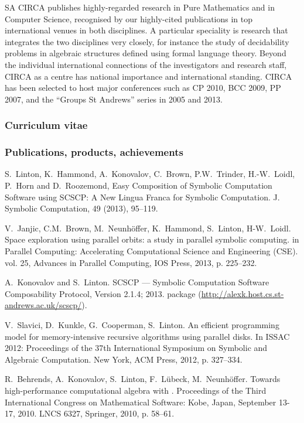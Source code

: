 \begin{sitedescription}{SA}
CIRCA publishes highly-regarded research in Pure Mathematics and in
Computer Science, recognised by our highly-cited publications in top
international venues in both disciplines. A particular speciality is
research that integrates the two disciplines very closely, for
instance the study of decidability problems in algebraic structures
defined using formal language theory. Beyond the individual international connections of the 
investigators and research staff, CIRCA as a centre has national 
importance and international standing. CIRCA has been selected to host 
major conferences such as CP 2010, BCC 2009, PP 2007, and the 
``Groups St Andrews'' series in 2005 and 2013.


\subsubsection*{Curriculum vitae}





%


\subsubsection*{Publications, products, achievements}

\begin{compactenum}
\item 
S.~Linton, K.~Hammond, A.~Konovalov, C.~Brown, P.W.~Trinder, H.-W.~Loidl, 
P.~Horn and D.~Roozemond, Easy Composition of Symbolic Computation Software using 
SCSCP: A New Lingua Franca for Symbolic Computation.
J. Symbolic Computation, 49 (2013), 95--119.
\item
V.~Janjic, C.M.~Brown, M.~Neunh{\"o}ffer, K.~Hammond, S.~Linton, H-W.~Loidl. 
Space exploration using parallel orbits: a study in parallel symbolic computing.
in Parallel Computing: Accelerating Computational Science and Engineering (CSE). 
vol. 25, Advances in Parallel Computing, IOS Press, 2013, p. 225--232.
\item 
A.~Konovalov and S.~Linton. 
SCSCP --- Symbolic Computation Software Composability Protocol, 
Version 2.1.4; 2013. \GAP package (\url{http://alexk.host.cs.st-andrews.ac.uk/scscp/}).
\item
V.~Slavici, D.~Kunkle, G.~Cooperman, S.~Linton. 
An efficient programming model for memory-intensive recursive 
algorithms using parallel disks. In ISSAC 2012: Proceedings of 
the 37th International Symposium on Symbolic and Algebraic Computation. 
New York, ACM Press, 2012, p. 327--334.
\item 
R.~Behrends, A.~Konovalov, S.~Linton, F.~L{\"u}beck, M.~Neunh{\"o}ffer.
Towards high-performance computational algebra with \GAP.
Proceedings of the Third International Congress on Mathematical Software: 
Kobe, Japan, September 13-17, 2010. LNCS 6327, Springer, 2010, p. 58--61.


\end{compactenum}
\end{sitedescription}
